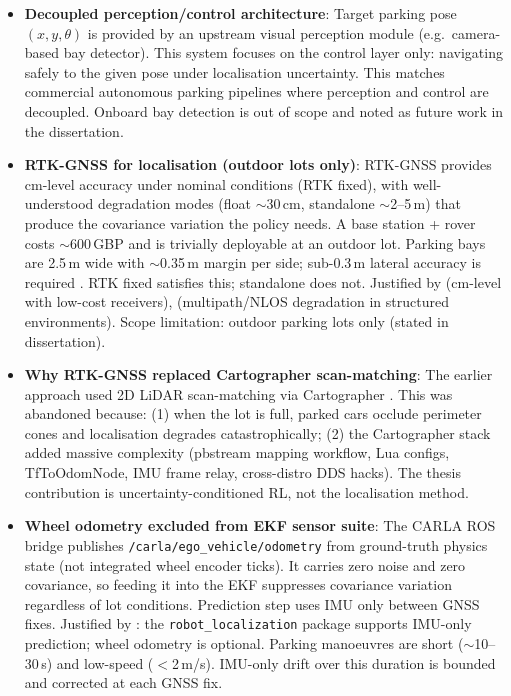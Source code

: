 \documentclass[11pt,a4paper]{article}
\begin{document}
\begin{itemize}[leftmargin=*]
  \item \textbf{Decoupled perception/control architecture}:
        Target parking pose $(x, y, \theta)$ is provided by an upstream visual
        perception module (e.g.\ camera-based bay detector). This system focuses
        on the control layer only: navigating safely to the given pose under
        localisation uncertainty. This matches commercial autonomous parking
        pipelines \cite{bosch_automated_parking, valeo_park4u} where perception
        and control are decoupled. Onboard bay detection is out of scope and
        noted as future work in the dissertation.

  \item \textbf{RTK-GNSS for localisation (outdoor lots only)}:
        RTK-GNSS provides cm-level accuracy under nominal conditions (RTK fixed),
        with well-understood degradation modes (float $\sim$30\,cm, standalone
        $\sim$2--5\,m) that produce the covariance variation the policy needs.
        A base station + rover costs $\sim$600\,GBP and is trivially deployable
        at an outdoor lot. Parking bays are 2.5\,m wide with $\sim$0.35\,m margin
        per side; sub-0.3\,m lateral accuracy is required \cite{reid2019localization}.
        RTK fixed satisfies this; standalone does not.
        Justified by \cite{takasu2009rtklib} (cm-level with low-cost receivers),
        \cite{groves2013gnss} (multipath/NLOS degradation in structured environments).
        Scope limitation: outdoor parking lots only (stated in dissertation).

  \item \textbf{Why RTK-GNSS replaced Cartographer scan-matching}:
        The earlier approach used 2D LiDAR scan-matching via Cartographer
        \cite{cartographer2016}. This was abandoned because: (1) when the lot
        is full, parked cars occlude perimeter cones and localisation degrades
        catastrophically; (2) the Cartographer stack added massive complexity
        (pbstream mapping workflow, Lua configs, TfToOdomNode, IMU frame relay,
        cross-distro DDS hacks). The thesis contribution is uncertainty-conditioned
        RL, not the localisation method.

  \item \textbf{Wheel odometry excluded from EKF sensor suite}:
        The CARLA ROS bridge publishes \texttt{/carla/ego\_vehicle/odometry}
        from ground-truth physics state (not integrated wheel encoder ticks).
        It carries zero noise and zero covariance, so feeding it into the EKF
        suppresses covariance variation regardless of lot conditions.
        Prediction step uses IMU only between GNSS fixes.
        Justified by \cite{moore2014generalized}: the \texttt{robot\_localization}
        package supports IMU-only prediction; wheel odometry is optional.
        Parking manoeuvres are short ($\sim$10--30\,s) and low-speed
        ($<$2\,m/s). IMU-only drift over this duration is bounded and
        corrected at each GNSS fix.


\end{itemize}
\end{document}
